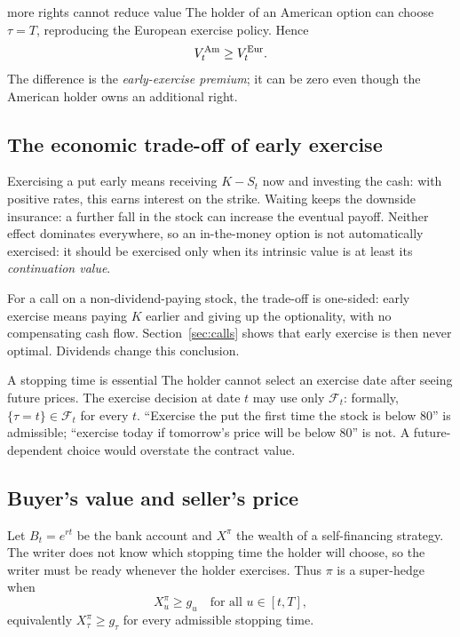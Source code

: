 \documentclass[10pt]{article}
\newcommand{\1}{\mathbf 1}
\newcommand{\cF}{\mathcal F}
\theoremstyle{definition}
\begin{document}
\begin{boardexample}{more rights cannot reduce value}
The holder of an American option can choose \(\tau=T\), reproducing the
European exercise policy. Hence
\[
V_t^{\rm Am}\geq V_t^{\rm Eur}.
\]
The difference is the \emph{early-exercise premium}; it can be zero even
though the American holder owns an additional right.
\end{boardexample}

\subsection{The economic trade-off of early exercise}

Exercising a put early means receiving \(K-S_t\) now and investing the cash:
with positive rates, this earns interest on the strike. Waiting keeps the
downside insurance: a further fall in the stock can increase the eventual
payoff. Neither effect dominates everywhere, so an in-the-money option is not
automatically exercised: it should be exercised only when its intrinsic value
is at least its \emph{continuation value}.

For a call on a non-dividend-paying stock, the trade-off is one-sided: early
exercise means paying \(K\) earlier and giving up the optionality, with no
compensating cash flow. Section~\ref{sec:calls} shows that early exercise is
then never optimal. Dividends change this conclusion.

\begin{warningbox}{A stopping time is essential}
The holder cannot select an exercise date after seeing future prices. The
exercise decision at date \(t\) may use only \(\cF_t\): formally,
\(\{\tau=t\}\in\cF_t\) for every \(t\). ``Exercise the put the first time the
stock is below \(80\)'' is admissible; ``exercise today if tomorrow's price
will be below \(80\)'' is not. A future-dependent choice would overstate the
contract value.
\end{warningbox}

\subsection{Buyer's value and seller's price}

Let \(B_t=e^{rt}\) be the bank account and \(X^\pi\) the wealth of a
self-financing strategy. The writer does not know which stopping time the
holder will choose, so the writer must be ready whenever the holder exercises.
Thus \(\pi\) is a super-hedge when
\[
X^\pi_u\geq g_u\quad\text{for all }u\in[t,T],
\]
equivalently \(X^\pi_\tau\geq g_\tau\) for every admissible stopping time.
\end{document}
